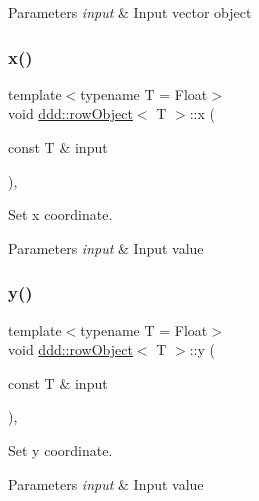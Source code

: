 \begin{DoxyParams}{Parameters}
{\em input} & Input vector object \\
\hline
\end{DoxyParams}
\mbox{\label{classddd_1_1row_object_afe92fca2bf490cdef9b684bd3847d7eb}} 
\subsubsection{\texorpdfstring{x()}{x()}}
{\footnotesize\ttfamily template$<$typename T  = Float$>$ \\
void \hyperlink{classddd_1_1row_object}{ddd\+::row\+Object}$<$ T $>$\+::x (\begin{DoxyParamCaption}\item[{const T \&}]{input }\end{DoxyParamCaption})\hspace{0.3cm}{\ttfamily [inline]}, {\ttfamily [inherited]}}



Set x coordinate. 


\begin{DoxyParams}{Parameters}
{\em input} & Input value \\
\hline
\end{DoxyParams}
\mbox{\label{classddd_1_1row_object_aeb7d81b5fcffd7d8a17fea5b85c37b43}} 
\subsubsection{\texorpdfstring{y()}{y()}}
{\footnotesize\ttfamily template$<$typename T  = Float$>$ \\
void \hyperlink{classddd_1_1row_object}{ddd\+::row\+Object}$<$ T $>$\+::y (\begin{DoxyParamCaption}\item[{const T \&}]{input }\end{DoxyParamCaption})\hspace{0.3cm}{\ttfamily [inline]}, {\ttfamily [inherited]}}



Set y coordinate. 


\begin{DoxyParams}{Parameters}
{\em input} & Input value \\
\hline
\end{DoxyParams}
\mbox{\label{classddd_1_1row_object_a42c5766595f9ccb58435d97b8a9e0612}} 
